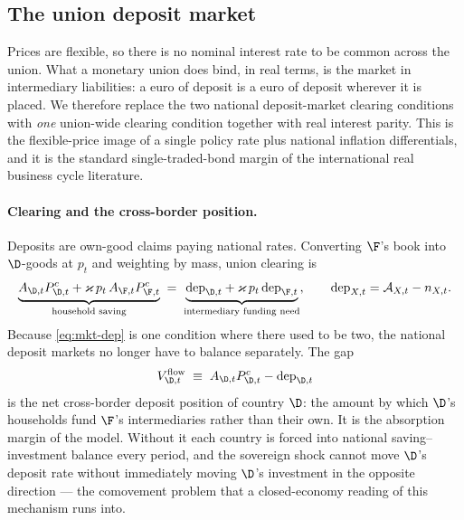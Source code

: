 \subsection{The union deposit market}
\label{sec:union-deposits}

Prices are flexible, so there is no nominal interest rate to be common across the
union. What a monetary union does bind, in real terms, is the market in
intermediary liabilities: a euro of deposit is a euro of deposit wherever it is
placed. We therefore replace the two national deposit-market clearing conditions
with \emph{one} union-wide clearing condition together with real interest parity.
This is the flexible-price image of a single policy rate plus national inflation
differentials, and it is the standard single-traded-bond margin of the
international real business cycle literature.

\paragraph{Clearing and the cross-border position.} Deposits are own-good claims
paying national rates. Converting $\F$'s book into $\D$-goods at $p_t$ and
weighting by mass, union clearing is
\begin{equation}
\underbrace{A_{\D,t}P^{c}_{\D,t}+\varkappa\,p_t\,A_{\F,t}P^{c}_{\F,t}}
           _{\text{household saving}}
\;=\;
\underbrace{\mathrm{dep}_{\D,t}+\varkappa\,p_t\,\mathrm{dep}_{\F,t}}
           _{\text{intermediary funding need}},
\qquad
\mathrm{dep}_{X,t}=\mathcal{A}_{X,t}-n_{X,t}.
\label{eq:mkt-dep}
\end{equation}
Because \eqref{eq:mkt-dep} is one condition where there used to be two, the
national deposit markets no longer have to balance separately. The gap
\begin{equation}
V^{\rm flow}_{\D,t}\;\equiv\;A_{\D,t}P^{c}_{\D,t}-\mathrm{dep}_{\D,t}
\label{eq:nfa-flow}
\end{equation}
is the net cross-border deposit position of country $\D$: the amount by which
$\D$'s households fund $\F$'s intermediaries rather than their own. It is the
absorption margin of the model. Without it each country is forced into national
saving--investment balance every period, and the sovereign shock cannot move
$\D$'s deposit rate without immediately moving $\D$'s investment in the opposite
direction --- the comovement problem that a closed-economy reading of this
mechanism runs into.

